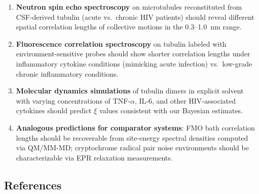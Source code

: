\documentclass[11pt]{article}
\begin{document}
\begin{enumerate}
    \item \textbf{Neutron spin echo spectroscopy} on microtubules reconstituted from CSF-derived 
    tubulin (acute vs.\ chronic HIV patients) should reveal different spatial correlation lengths 
    of collective motions in the 0.3--1.0~nm range.
    
    \item \textbf{Fluorescence correlation spectroscopy} on tubulin labeled with environment-sensitive 
    probes should show shorter correlation lengths under inflammatory cytokine conditions (mimicking 
    acute infection) vs.\ low-grade chronic inflammatory conditions.
    
    \item \textbf{Molecular dynamics simulations} of tubulin dimers in explicit solvent with varying 
    concentrations of TNF-$\alpha$, IL-6, and other HIV-associated cytokines should predict 
    $\xi$ values consistent with our Bayesian estimates.
    
    \item \textbf{Analogous predictions for comparator systems}: FMO bath correlation lengths 
    should be recoverable from site-energy spectral densities computed via QM/MM-MD; cryptochrome 
    radical pair noise environments should be characterizable via EPR relaxation measurements.
\end{enumerate}

\subsection{References}
\end{document}
